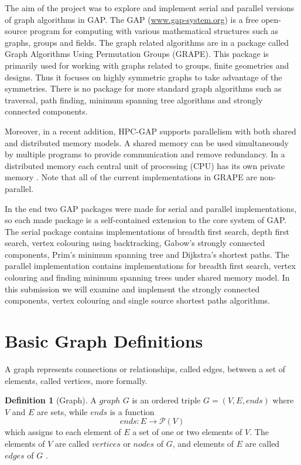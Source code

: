 \documentclass{report}
\theoremstyle{plain}
\theoremstyle{definition}
\newtheorem{definition}{Definition}
\theoremstyle{remark}
\numberwithin{definition}{chapter}
\numberwithin{example}{chapter}
\numberwithin{figure}{chapter}
\numberwithin{theorem}{chapter}
\numberwithin{lemma}{chapter}
\begin{document}
The aim of the project was to explore and implement serial and parallel versions of graph algorithms in GAP. The GAP (\url{www.gap-system.org}) is a free open-source program for computing with various mathematical structures such as graphs, groups and fields. The graph related algorithms are in a package called Graph Algorithms Using Permutation Groups (GRAPE). This package is primarily used for working with graphs related to groups, finite geometries and designs. Thus it focuses on highly symmetric graphs to take advantage of the symmetries. There is no package for more standard graph algorithms such as traversal, path finding, minimum spanning tree algorithms and strongly connected components.

Moreover, in a recent addition, HPC-GAP supports parallelism with both shared and distributed memory models. A shared memory can be used simultaneously by multiple programs to provide communication and remove redundancy. In a distributed memory each central unit of processing (CPU) has its own private memory \cite{berman1996fundamentals}. Note that all of the current implementations in GRAPE are non-parallel.

In the end two GAP packages were made for serial and parallel implementations, so each made package is a self-contained extension to the core system of GAP. The serial package contains implementations of breadth first search, depth first search, vertex colouring using backtracking, Gabow's strongly connected components, Prim's minimum spanning tree and Dijkstra's shortest paths. The parallel implementation contains implementations for breadth first search, vertex colouring and finding minimum spanning trees under shared memory model. In this submission we will examine and implement the strongly connected components, vertex colouring and single source shortest paths algorithms.

\section{Basic Graph Definitions}

A graph represents connections or relationships, called edges, between a set of elements, called vertices, more formally.

\begin{definition}[Graph]
A $graph$  $G$ is an ordered triple $G = (V, E, ends)$ where $V$ and $E$ are sets, while $ends$ is a function 
  \begin{equation}
  ends:E\to \mathcal P \left({V}\right)
  \end{equation}
which assigns to each element of $E$ a set of one or two elements of $V$. The elements of $V$ are called $vertices$ or $nodes$ of $G$, and elements of $E$ are called $edges$ of $G$ \cite{bondy2008graph}.
\end{definition}
\end{document}
